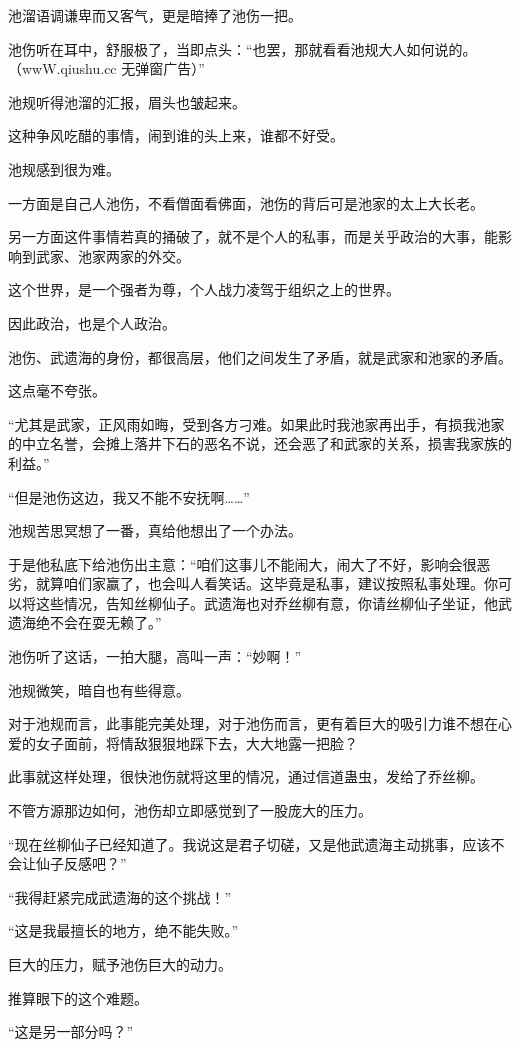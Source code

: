\begin{this_body}
池溜语调谦卑而又客气，更是暗捧了池伤一把。

池伤听在耳中，舒服极了，当即点头：“也罢，那就看看池规大人如何说的。（wwW.qiushu.cc 无弹窗广告）”

池规听得池溜的汇报，眉头也皱起来。

这种争风吃醋的事情，闹到谁的头上来，谁都不好受。

池规感到很为难。

一方面是自己人池伤，不看僧面看佛面，池伤的背后可是池家的太上大长老。

另一方面这件事情若真的捅破了，就不是个人的私事，而是关乎政治的大事，能影响到武家、池家两家的外交。

这个世界，是一个强者为尊，个人战力凌驾于组织之上的世界。

因此政治，也是个人政治。

池伤、武遗海的身份，都很高层，他们之间发生了矛盾，就是武家和池家的矛盾。

这点毫不夸张。

“尤其是武家，正风雨如晦，受到各方刁难。如果此时我池家再出手，有损我池家的中立名誉，会摊上落井下石的恶名不说，还会恶了和武家的关系，损害我家族的利益。”

“但是池伤这边，我又不能不安抚啊……”

池规苦思冥想了一番，真给他想出了一个办法。

于是他私底下给池伤出主意：“咱们这事儿不能闹大，闹大了不好，影响会很恶劣，就算咱们家赢了，也会叫人看笑话。这毕竟是私事，建议按照私事处理。你可以将这些情况，告知丝柳仙子。武遗海也对乔丝柳有意，你请丝柳仙子坐证，他武遗海绝不会在耍无赖了。”

池伤听了这话，一拍大腿，高叫一声：“妙啊！”

池规微笑，暗自也有些得意。

对于池规而言，此事能完美处理，对于池伤而言，更有着巨大的吸引力谁不想在心爱的女子面前，将情敌狠狠地踩下去，大大地露一把脸？

此事就这样处理，很快池伤就将这里的情况，通过信道蛊虫，发给了乔丝柳。

不管方源那边如何，池伤却立即感觉到了一股庞大的压力。

“现在丝柳仙子已经知道了。我说这是君子切磋，又是他武遗海主动挑事，应该不会让仙子反感吧？”

“我得赶紧完成武遗海的这个挑战！”

“这是我最擅长的地方，绝不能失败。”

巨大的压力，赋予池伤巨大的动力。

推算眼下的这个难题。

“这是另一部分吗？”


\end{this_body}
